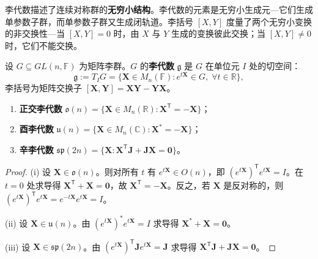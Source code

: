 \begin{remark}[李代数在周期数学中的意义]\label{rem:lie_algebra_periodic_meaning}
李代数描述了连续对称群的\textbf{无穷小结构}。李代数的元素是无穷小生成元---它们生成单参数子群，而单参数子群又生成闭轨道。李括号 $[X,Y]$ 度量了两个无穷小变换的非交换性---当 $[X,Y] = 0$ 时，由 $X$ 与 $Y$ 生成的变换彼此交换；当 $[X,Y] \neq 0$ 时，它们不能交换。
\end{remark}

\begin{definition}[矩阵李代数]\label{def:matrix_lie_algebra}
设 $G \subseteq GL(n, \mathbb{F})$ 为矩阵李群。$G$ 的\textbf{李代数} $\mathfrak{g}$ 是 $G$ 在单位元 $I$ 处的切空间：
\[
\mathfrak{g} := T_I G = \{\mathbf{X} \in M_n(\mathbb{F}) : e^{t\mathbf{X}} \in G, \; \forall t \in \mathbb{R}\},
\]
李括号为矩阵交换子 $[\mathbf{X}, \mathbf{Y}] = \mathbf{XY} - \mathbf{YX}$。
\end{definition}

\begin{proposition}[三个基本矩阵李代数]\label{prop:three_matrix_lie_algebras}
\begin{enumerate}[label=(\roman*)]
    \item \textbf{正交李代数} $\mathfrak{o}(n) = \{\mathbf{X} \in M_n(\mathbb{R}) : \mathbf{X}^{\mathsf T} = -\mathbf{X}\}$；
    \item \textbf{酉李代数} $\mathfrak{u}(n) = \{\mathbf{X} \in M_n(\mathbb{C}) : \mathbf{X}^* = -\mathbf{X}\}$；
    \item \textbf{辛李代数} $\mathfrak{sp}(2n) = \{\mathbf{X} : \mathbf{X}^{\mathsf T}\mathbf{J} + \mathbf{J}\mathbf{X} = \mathbf{0}\}$。
\end{enumerate}
\end{proposition}

\begin{proof}
(i) 设 $\mathbf{X} \in \mathfrak{o}(n)$。则对所有 $t$ 有 $e^{t\mathbf{X}} \in O(n)$，即 $(e^{t\mathbf{X}})^{\mathsf T} e^{t\mathbf{X}} = I$。在 $t = 0$ 处求导得 $\mathbf{X}^{\mathsf T} + \mathbf{X} = \mathbf{0}$，故 $\mathbf{X}^{\mathsf T} = -\mathbf{X}$。反之，若 $\mathbf{X}$ 是反对称的，则 $(e^{t\mathbf{X}})^{\mathsf T} e^{t\mathbf{X}} = e^{-t\mathbf{X}} e^{t\mathbf{X}} = I$。

(ii) 设 $\mathbf{X} \in \mathfrak{u}(n)$。由 $(e^{t\mathbf{X}})^* e^{t\mathbf{X}} = I$ 求导得 $\mathbf{X}^* + \mathbf{X} = \mathbf{0}$。

(iii) 设 $\mathbf{X} \in \mathfrak{sp}(2n)$。由 $(e^{t\mathbf{X}})^{\mathsf T} \mathbf{J} e^{t\mathbf{X}} = \mathbf{J}$ 求导得 $\mathbf{X}^{\mathsf T}\mathbf{J} + \mathbf{J}\mathbf{X} = \mathbf{0}$。
\end{proof}

